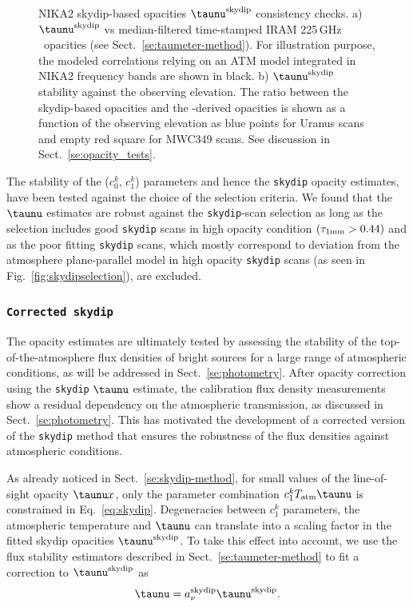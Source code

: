 \begin{figure}[!thbp]
\begin{center}
   \caption[]{NIKA2
     skydip-based opacities $\taunu^{\rm{skydip}}$ consistency checks.
     a) $\taunu^{\rm{skydip}}$ vs median-filtered
    time-stamped IRAM 225\,GHz \taumeter\ opacities (see
    Sect.~\ref{se:taumeter-method}).
    For illustration purpose, the modeled correlations relying on an ATM model integrated in
    NIKA2 frequency bands are shown in black. b) $\taunu^{\rm{skydip}}$ stability against the observing
    elevation. The ratio between the skydip-based opacities and the
    \taumeter-derived opacities is shown as a function of the observing
    elevation as blue points for Uranus scans and empty red square for
    MWC349 scans. See discussion in Sect.~\ref{se:opacity_tests}. } 
\label{fig:skydip-to-taumeter-correl}
\end{center}
\end{figure}
%
The stability of the ($c_0^k$, $c_1^k$) parameters and hence the
{\tt skydip} opacity estimates, have been tested against the
choice of the selection criteria. We found that the $\taunu$
estimates are robust against the {\tt skydip}-scan selection as long as the
selection includes good {\tt skydip} scans in high opacity condition
$(\tau_{1\rm{mm}} > 0.44)$ and as the poor
fitting {\tt skydip} scans, which mostly correspond to deviation from the
atmosphere plane-parallel model in high opacity {\tt skydip} scans (as seen in
Fig.~\ref{fig:skydipselection}), are excluded.


\subsubsection{{\tt Corrected skydip}}
\label{se:corrected-skydip}
The opacity estimates are ultimately tested by assessing the
stability of the top-of-the-atmosphere flux densities of bright sources for a large
range of atmospheric conditions, as will be addressed in
Sect.~\ref{se:photometry}. After opacity correction using the
{\tt skydip} $\taunu$ estimate, the calibration flux density
measurements show a residual dependency on the atmospheric
transmission, as discussed in Sect.~\ref{se:photometry}. This has
motivated the development of a corrected version of the {\tt skydip}
method that ensures the robustness of the flux densities against
atmospheric conditions.

{\lp As already noticed in Sect.~\ref{se:skydip-method}, for small values of the
line-of-sight opacity $\taunu x$, only the parameter combination
$c_1^k T_{\rm{atm}}\taunu$ is constrained in
Eq.~\ref{eq:skydip}. Degeneracies between $c_1^k$ parameters, the
atmospheric temperature and $\taunu$ can translate into a
scaling factor in the fitted skydip opacities
$\taunu^{\rm{skydip}}$. To take this effect into account, }  
we use the flux stability estimators described in
Sect.~\ref{se:taumeter-method} to fit a correction to $\taunu^{\rm{skydip}}$ as
\begin{equation}  
  \taunu =  a_\nu^{\rm{skydip}}\taunu^{\rm{skydip}}.
  \label{eq:corrected_skydip}
\end{equation}

